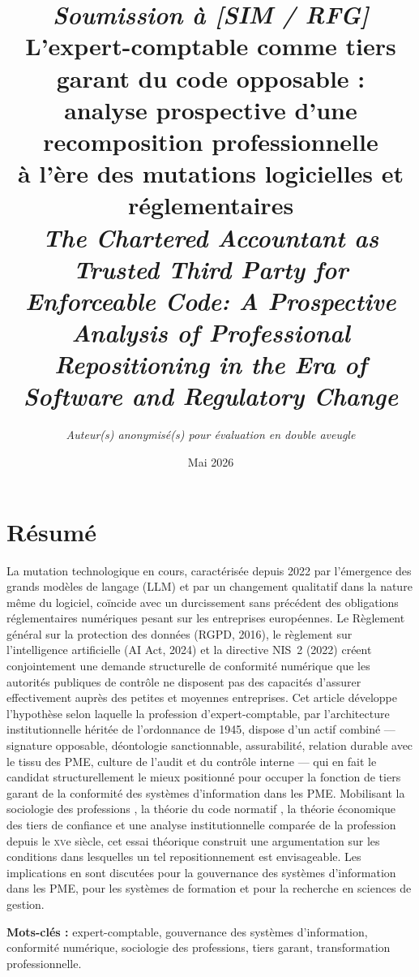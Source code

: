 \documentclass[12pt,a4paper]{article}
\title{%
  \vspace{-1cm}
  {\normalsize\itshape Soumission à \textnormal{[SIM / RFG]}}\\[0.8em]
  \textbf{L'expert-comptable comme tiers garant du code opposable :}\\
  \textbf{analyse prospective d'une recomposition professionnelle}\\
  \textbf{à l'ère des mutations logicielles et réglementaires}\\[0.6em]
  {\normalsize\textit{The Chartered Accountant as Trusted Third Party
  for Enforceable Code: A Prospective Analysis of Professional
  Repositioning in the Era of Software and Regulatory Change}}%
}
\author{\textit{Auteur(s) anonymisé(s) pour évaluation en double aveugle}}
\date{Mai 2026}
\begin{document}
\maketitle
\thispagestyle{empty}

\section*{Résumé}

La mutation technologique en cours, caractérisée depuis 2022 par l'émergence des grands modèles de langage (LLM) et par un changement qualitatif dans la nature même du logiciel, coïncide avec un durcissement sans précédent des obligations réglementaires numériques pesant sur les entreprises européennes. Le Règlement général sur la protection des données (RGPD, 2016), le règlement sur l'intelligence artificielle (AI Act, 2024) et la directive NIS~2 (2022) créent conjointement une demande structurelle de conformité numérique que les autorités publiques de contrôle ne disposent pas des capacités d'assurer effectivement auprès des petites et moyennes entreprises. Cet article développe l'hypothèse selon laquelle la profession d'expert-comptable, par l'architecture institutionnelle héritée de l'ordonnance de 1945, dispose d'un actif combiné — signature opposable, déontologie sanctionnable, assurabilité, relation durable avec le tissu des PME, culture de l'audit et du contrôle interne — qui en fait le candidat structurellement le mieux positionné pour occuper la fonction de tiers garant de la conformité des systèmes d'information dans les PME. Mobilisant la sociologie des professions \parencite{abbott1988}, la théorie du code normatif \parencite{lessig1999}, la théorie économique des tiers de confiance et une analyse institutionnelle comparée de la profession depuis le \textsc{xv}e siècle, cet essai théorique construit une argumentation sur les conditions dans lesquelles un tel repositionnement est envisageable. Les implications en sont discutées pour la gouvernance des systèmes d'information dans les PME, pour les systèmes de formation et pour la recherche en sciences de gestion.

\textbf{Mots-clés :} expert-comptable, gouvernance des systèmes d'information, conformité numérique, sociologie des professions, tiers garant, transformation professionnelle.

\bigskip
\end{document}
